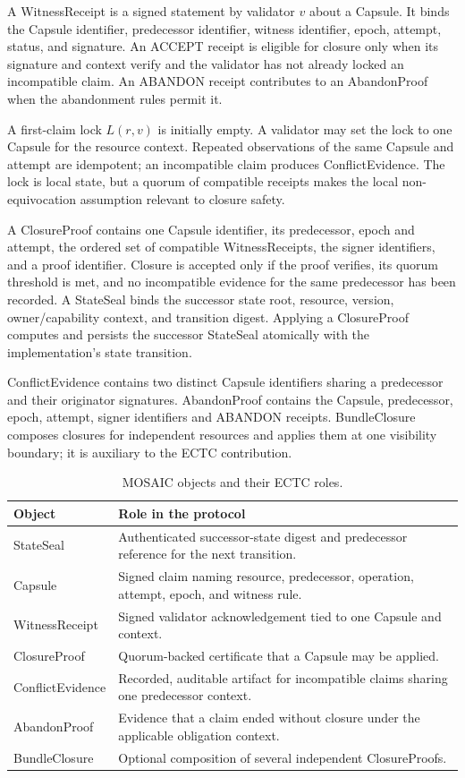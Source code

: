 \documentclass{ledger}
\begin{document}
A WitnessReceipt is a signed statement by validator $v$ about a Capsule. It binds the Capsule identifier, predecessor identifier, witness identifier, epoch, attempt, status, and signature. An ACCEPT receipt is eligible for closure only when its signature and context verify and the validator has not already locked an incompatible claim. An ABANDON receipt contributes to an AbandonProof when the abandonment rules permit it.

A first-claim lock $L(r,v)$ is initially empty. A validator may set the lock to one Capsule for the resource context. Repeated observations of the same Capsule and attempt are idempotent; an incompatible claim produces ConflictEvidence. The lock is local state, but a quorum of compatible receipts makes the local non-equivocation assumption relevant to closure safety.

A ClosureProof contains one Capsule identifier, its predecessor, epoch and attempt, the ordered set of compatible WitnessReceipts, the signer identifiers, and a proof identifier. Closure is accepted only if the proof verifies, its quorum threshold is met, and no incompatible evidence for the same predecessor has been recorded. A StateSeal binds the successor state root, resource, version, owner/capability context, and transition digest. Applying a ClosureProof computes and persists the successor StateSeal atomically with the implementation's state transition.

ConflictEvidence contains two distinct Capsule identifiers sharing a predecessor and their originator signatures. AbandonProof contains the Capsule, predecessor, epoch, attempt, signer identifiers and ABANDON receipts. BundleClosure composes closures for independent resources and applies them at one visibility boundary; it is auxiliary to the ECTC contribution.

\begin{table}[h]
\centering
\caption{MOSAIC objects and their ECTC roles.}
\label{tab:objects}
\begin{tabularx}{\textwidth}{p{3.1cm}X}
\toprule
Object & Role in the protocol \\
\midrule
StateSeal & Authenticated successor-state digest and predecessor reference for the next transition. \\
Capsule & Signed claim naming resource, predecessor, operation, attempt, epoch, and witness rule. \\
WitnessReceipt & Signed validator acknowledgement tied to one Capsule and context. \\
ClosureProof & Quorum-backed certificate that a Capsule may be applied. \\
ConflictEvidence & Recorded, auditable artifact for incompatible claims sharing one predecessor context. \\
AbandonProof & Evidence that a claim ended without closure under the applicable obligation context. \\
BundleClosure & Optional composition of several independent ClosureProofs. \\
\bottomrule
\end{tabularx}
\end{table}
\end{document}
